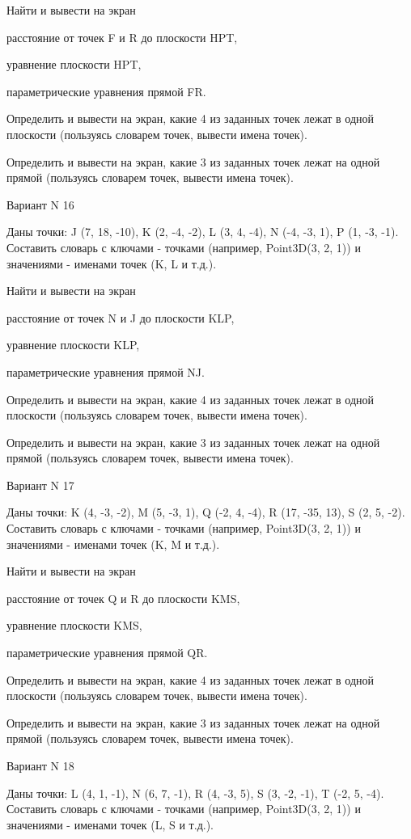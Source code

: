 \documentclass[11pt]{report}
\begin{document}
 
Найти и вывести на экран


расстояние от точек F и R до плоскости HPT,

 
уравнение плоскости HPT,

 
параметрические уравнения прямой FR.


Определить и вывести на экран, какие 4 из заданных точек лежат в одной плоскости (пользуясь словарем точек, вывести имена точек).


Определить и вывести на экран, какие 3 из заданных точек лежат на одной прямой (пользуясь словарем точек, вывести имена точек).

Вариант N 16

Даны точки: J (7, 18, -10), K (2, -4, -2), L (3, 4, -4), N (-4, -3, 1), P (1, -3, -1).
Составить словарь с ключами - точками (например, Point3D(3, 2, 1)) и значениями - именами точек (K, L и т.д.).

 
Найти и вывести на экран


расстояние от точек N и J до плоскости KLP,

 
уравнение плоскости KLP,

 
параметрические уравнения прямой NJ.


Определить и вывести на экран, какие 4 из заданных точек лежат в одной плоскости (пользуясь словарем точек, вывести имена точек).


Определить и вывести на экран, какие 3 из заданных точек лежат на одной прямой (пользуясь словарем точек, вывести имена точек).

Вариант N 17

Даны точки: K (4, -3, -2), M (5, -3, 1), Q (-2, 4, -4), R (17, -35, 13), S (2, 5, -2).
Составить словарь с ключами - точками (например, Point3D(3, 2, 1)) и значениями - именами точек (K, M и т.д.).

 
Найти и вывести на экран


расстояние от точек Q и R до плоскости KMS,

 
уравнение плоскости KMS,

 
параметрические уравнения прямой QR.


Определить и вывести на экран, какие 4 из заданных точек лежат в одной плоскости (пользуясь словарем точек, вывести имена точек).


Определить и вывести на экран, какие 3 из заданных точек лежат на одной прямой (пользуясь словарем точек, вывести имена точек).

Вариант N 18

Даны точки: L (4, 1, -1), N (6, 7, -1), R (4, -3, 5), S (3, -2, -1), T (-2, 5, -4).
Составить словарь с ключами - точками (например, Point3D(3, 2, 1)) и значениями - именами точек (L, S и т.д.).
\end{document}
